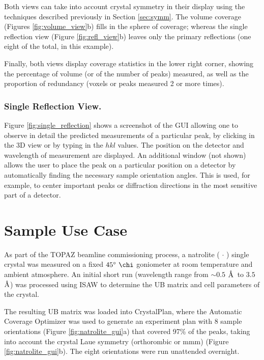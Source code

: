 \documentclass[final]{iucr}              %
\newcommand{\ang}{$\mathrm{\AA} $}
\begin{document}
Both views can take into account crystal symmetry in their display using the
techniques described previously in Section \ref{sec:symm}.
The volume coverage (Figures \ref{fig:volume_view}b) fills in the sphere of
coverage; 
whereas the single reflection view (Figure \ref{fig:refl_view}b) leaves only
the primary reflections (one eight of the total, in this example).
 
Finally, both views display coverage statistics in the lower right
corner, showing the percentage of volume (or of the number of peaks) measured,
as well as the proportion of redundancy (voxels or peaks measured 2 or more
times). 

\subsubsection{Single Reflection View.}
Figure \ref{fig:single_reflection} shows a screenshot of the GUI allowing one to
observe in detail the predicted measurements of a particular peak, by clicking
in the 3D view or by typing in the $hkl$ values. The position on the detector
and wavelength of measurement are displayed. An additional window (not shown) allows the user to place the peak on a particular
position on a detector by automatically finding the necessary sample orientation
angles. This is used, for example, to center important peaks or diffraction
directions in the most sensitive part of a detector.



\section{Sample Use Case}

As part of the TOPAZ beamline commissioning process, a natrolite
( $\cdot$ ) single crystal was measured on a fixed
$45\degree\ \chi$ goniometer at room temperature and ambient atmosphere. An
initial short run (wavelength range from $\sim0.5$ \ang\ to $3.5$ \ang)
was processed using ISAW to determine the UB matrix and cell parameters of the crystal.

The resulting UB matrix was loaded into CrystalPlan, where the Automatic
Coverage Optimizer was used to generate an experiment plan with 8 sample
orientations (Figure \ref{fig:natrolite_gui}a) that covered 97\% of the peaks,
taking into account the crystal Laue symmetry (orthorombic or mmm) (Figure
\ref{fig:natrolite_gui}b). The eight orientations were run
unattended overnight.
\end{document}
